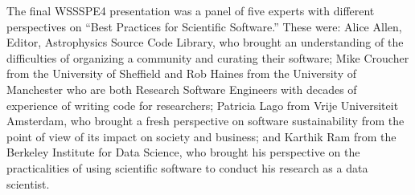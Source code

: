 \documentclass[11pt, oneside]{amsart}
\newcommand{\note}[1]{ {\textcolor{blueish}    { ***Note:      #1 }}}
\begin{document}







The final WSSSPE4 presentation was a panel %
of five experts with different perspectives on ``Best Practices for Scientific Software.''
These were: Alice Allen, Editor, Astrophysics Source Code Library, who brought an understanding of the difficulties of organizing a community and curating their software;
Mike Croucher from the University of Sheffield and Rob Haines from the University of Manchester who are both Research Software Engineers with decades of experience of writing code for researchers;
Patricia Lago from Vrije Universiteit Amsterdam, who brought a fresh perspective on software sustainability from the point of view of its impact on society and business; and
Karthik Ram from the Berkeley Institute for Data Science, who brought his perspective on the practicalities of using scientific software to conduct his research as a data scientist.
\end{document}
